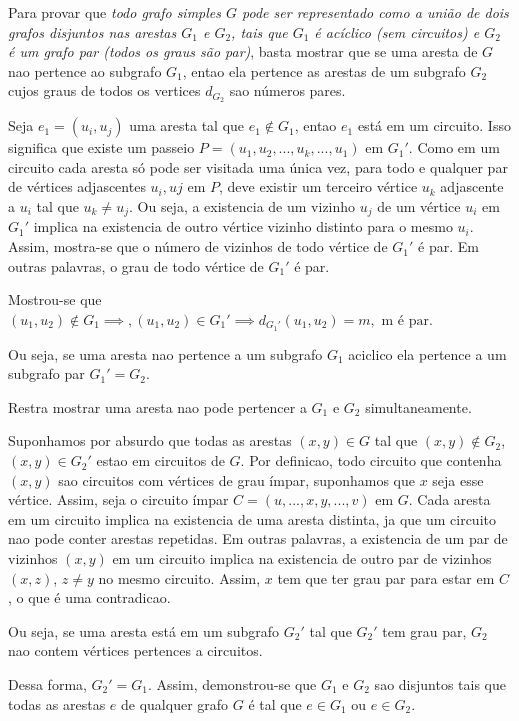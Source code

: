 \documentclass{article}
\begin{document}
  Para provar que \textit{todo grafo simples $G$ pode ser representado como a união de dois grafos disjuntos nas arestas $G_1$ e $G_2$, tais que $G_1$ é acíclico (sem circuitos) e $G_2$ é um grafo par (todos os graus são par)}, basta mostrar que se uma aresta de $G$ nao pertence ao subgrafo $G_1$, entao ela pertence as arestas de um subgrafo $G_2$ cujos graus de todos os vertices $d_{G_2}$ sao números pares.
  
 Seja $e_1 = (u_i, u_j) $ uma aresta tal que $ e_1 \notin G_1$, entao $e_1$ está em um circuito. Isso significa que existe um passeio $P = (u_1,u_2, ..., u_k, ..., u_1)$ em $G_1 '$. Como em um circuito cada aresta só pode ser visitada uma única vez, para todo e qualquer par de vértices adjascentes $u_i, uj$ em $P$, deve existir um terceiro vértice $u_k$ adjascente a $u_i$ tal que $u_k \neq u_j$. Ou seja, a existencia de  um vizinho  $u_j$ de um vértice $u_i$ em $G_1'$ implica na existencia de outro vértice vizinho distinto para o mesmo $u_i$. Assim, mostra-se que o número de vizinhos de todo vértice de $G_1'$ é par. Em outras palavras, o grau de todo vértice de $G_1'$ é par.
 
 Mostrou-se que  $ (u_1,u_2) \notin G_1 \implies, (u_1,u_2) \in G_1' \implies d_{G_1'}(u_1,u_2) = m, \text{   m é par}$. 
 
  Ou seja, se uma aresta nao pertence a um subgrafo $G_1$ aciclico ela pertence a um subgrafo par $G_1'= G_2$. 
 
Restra mostrar uma aresta nao pode pertencer a $G_1$ e $G_2$ simultaneamente. 

Suponhamos por absurdo que todas as arestas $(x,y) \in G$ tal que $(x,y) \notin G_2$, $(x,y) \in G_2'$  estao em circuitos de $G$. Por definicao, todo circuito que contenha $(x,y)$ sao circuitos com vértices de grau ímpar, suponhamos que $x$ seja esse vértice. Assim, seja o circuito ímpar $C = (u,..., x,y,...,v)$ em $G$. Cada aresta em um circuito implica na existencia de uma aresta distinta, ja que um circuito nao pode conter arestas repetidas. Em outras palavras, a existencia de um par de vizinhos $(x,y)$ em um circuito implica na existencia de outro par de vizinhos  $(x,z)$, $z \neq y$ no mesmo circuito.  Assim,  $x$ tem que ter grau par para estar em $C$, o que é uma contradicao.  

Ou seja, se uma aresta está em um subgrafo $G_2'$ tal que $G_2'$ tem grau par, $G_2$ nao contem vértices pertences a circuitos.

Dessa forma, $G_2'= G_1$. Assim, demonstrou-se que $G_1$ e $G_2$ sao disjuntos tais que todas as arestas $e$ de qualquer grafo $G$ é tal que $e \in G_1$ ou $e \in G_2$. 
\end{document}
